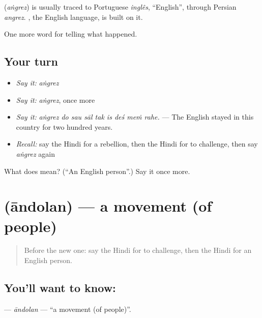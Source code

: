 \begin{cousinweb}
\textbf{} (\emph{aṅgrez}) is usually traced to Portuguese \emph{inglês}, \textquotedblleft{}English\textquotedblright{}, through Persian \emph{angrez}. \textbf{}, the English language, is built on it.
\end{cousinweb}

\begin{grammarlens}[title={What you've built}]
One more word for telling what happened.
\end{grammarlens}

\subsection*{Your turn}
\begin{itemize}
\raggedright
  \item \emph{Say it:} \emph{aṅgrez}
  \item \emph{Say it:} \emph{aṅgrez}, once more
  \item \emph{Say it:} \emph{aṅgrez do sau sāl tak is deś meṁ rahe.} — The English stayed in this country for two hundred years.
  \item \emph{Recall:} say the Hindi for a rebellion, then the Hindi for to challenge, then say \emph{aṅgrez} again
\end{itemize}

\begin{tcolorbox}[breakable,colback=teal!4,colframe=teal!35!black,title={Before you move on}]
What does  mean? (\textquotedblleft{}An English person\textquotedblright{}.) Say it once more.
\end{tcolorbox}
\section[\texorpdfstring{\hi{आंदोलन} (āndolan)}{आंदोलन (āndolan)}]{ (āndolan) — a movement (of people)}

\label{lesson:HI-C325-andolan}



\begin{quote}
Before the new one: say the Hindi for to challenge, then the Hindi for an English person.
\end{quote}

\subsection*{You'll want to know: }
\textbf{} — \emph{āndolan} — \textquotedblleft{}a movement (of people)\textquotedblright{}.

